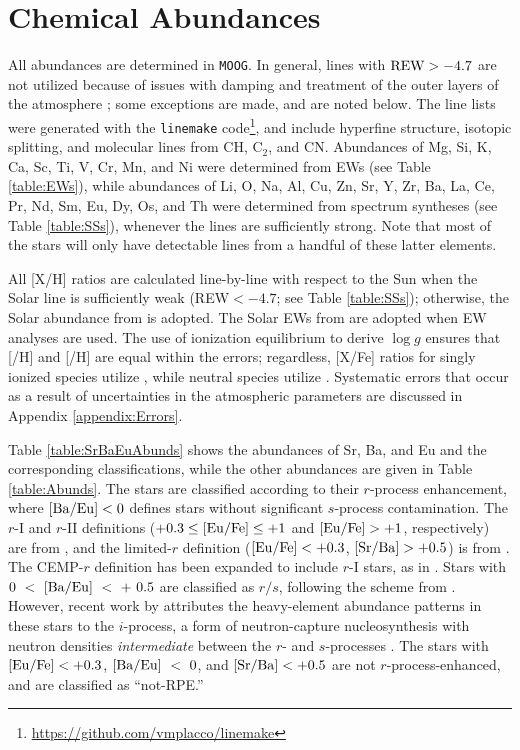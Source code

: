\documentclass[preprint]{aastex61}
\begin{document}
\section{Chemical Abundances}\label{sec:Abunds}
All abundances are determined in
{\texttt{MOOG}}.  In general, lines with $\rm{REW}>-4.7$ are not
utilized because of issues with damping and treatment of the outer
layers of the atmosphere \citep{McWilliam1995}; some exceptions are
made, and are noted below.  The line lists were generated with the
{\tt linemake}
code\footnote{\vspace{0.5in}\url{https://github.com/vmplacco/linemake}},
and include hyperfine structure, isotopic splitting, and molecular
lines from CH, C$_{2}$, and CN.  Abundances of Mg, Si, K, Ca, Sc, Ti,
V, Cr, Mn, and Ni were determined from EWs (see Table
\ref{table:EWs}), while abundances of Li, O, Na, Al, Cu, Zn, Sr, Y,
Zr, Ba, La, Ce, Pr, Nd, Sm, Eu, Dy, Os, and Th were determined from
spectrum syntheses (see Table \ref{table:SSs}), whenever the lines are
sufficiently strong. Note that most of the stars will only have
detectable lines from a handful of these latter elements.


All [X/H] ratios are calculated line-by-line with respect to the Sun
when the Solar line is sufficiently weak (REW$<-4.7$; see Table
\ref{table:SSs}); otherwise, the Solar abundance from
\citet{Asplund2009} is adopted. The Solar EWs from
\citet{Fulbright2006,Fulbright2007} are adopted when EW analyses are
used.  The use of ionization equilibrium to derive $\log g$ ensures
that [/H] and [/H] are equal within the errors;
regardless, [X/Fe] ratios for singly ionized species utilize
, while neutral species utilize .  Systematic
errors that occur as a result of uncertainties in the atmospheric
parameters are discussed in Appendix \ref{appendix:Errors}.

Table \ref{table:SrBaEuAbunds} shows the abundances of Sr, Ba, and Eu
and the corresponding classifications, while the other abundances are
given in Table \ref{table:Abunds}.  The stars are classified according
to their $r$-process enhancement, where $[\rm{Ba/Eu}]<0$ defines stars
without significant $s$-process contamination.  The $r$-I and $r$-II
definitions ($+0.3\le[\rm{Eu/Fe}]\le+1$ and $[\rm{Eu/Fe}]>+1$,
respectively) are from \citet{BeersChristlieb2005}, and the
limited-$r$ definition ($[\rm{Eu/Fe}] < +0.3$, $[\rm{Sr/Ba}]>+0.5$) is
from \citet{Frebel2018}.  The CEMP-$r$ definition has been expanded to
include $r$-I stars, as in \citet{Hansen2018}.  Stars with
$0~<~[\rm{Ba/Eu}]~<~+~0.5$ are classified as $r/s$, following the
scheme from \citet{BeersChristlieb2005}. However, recent work by
\citet{Hampel2016}  attributes the heavy-element abundance patterns in
these stars to the $i$-process, a form of neutron-capture
nucleosynthesis with neutron densities \textit{intermediate} between
the $r$- and $s$-processes \citep{CowanRose1977,Herwig2011}.
The stars with $[\rm{Eu/Fe}] < +0.3$, $[\rm{Ba/Eu}]~<~0$, and
$[\rm{Sr/Ba}]<+0.5$ are not $r$-process-enhanced, and are classified
as ``not-RPE.'' 
\end{document}
